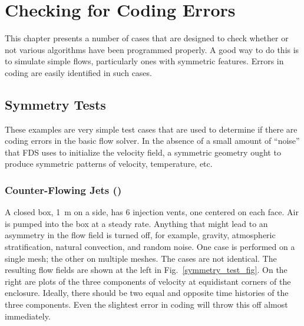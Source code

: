 \documentclass[11pt]{book}
\begin{document}
\label{geom_hrrpuv_init}
\label{geom_part_init}



\chapter{Checking for Coding Errors}

This chapter presents a number of cases that are designed to check whether or not various algorithms have been programmed properly. A good way to do this is to simulate simple flows, particularly ones with symmetric features. Errors in coding are easily identified in such cases.

\section{Symmetry Tests}

These examples are very simple test cases that are used to determine if there are coding errors in the basic flow solver. In the absence of a small amount of ``noise'' that FDS uses to initialize the velocity field, a symmetric geometry ought to produce symmetric patterns of velocity, temperature, etc.

\subsection{Counter-Flowing Jets (\texorpdfstring{}{symmetry\_test})}
\label{symmetry_test}
\label{symmetry_test_mpi}

A closed box, 1~m on a side, has 6 injection vents, one centered on each face. Air is pumped into the box at a steady rate. Anything that might lead to an asymmetry in the flow field is turned off, for example, gravity, atmospheric stratification, natural convection, and random noise. One case is performed on a single mesh; the other on multiple meshes. The cases are not identical. The resulting flow fields are shown at the left in Fig.~\ref{symmetry_test_fig}. On the right are plots of the three components of velocity at equidistant corners of the enclosure. Ideally, there should be two equal and opposite time histories of the three components. Even the slightest error in coding will throw this off almost immediately.
\end{document}
